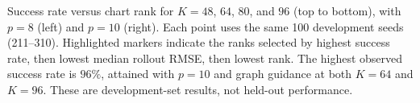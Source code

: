 \caption{Success rate versus chart rank for $K=48$, $64$, $80$, and $96$
(top to bottom), with $p=8$ (left) and $p=10$ (right). Each point uses
the same 100 development seeds (211--310). Highlighted markers indicate
the ranks selected by highest success rate, then lowest median rollout
RMSE, then lowest rank. The highest observed success rate is $96\%$,
attained with $p=10$ and graph guidance at both $K=64$ and $K=96$.
These are development-set results, not held-out performance.}
